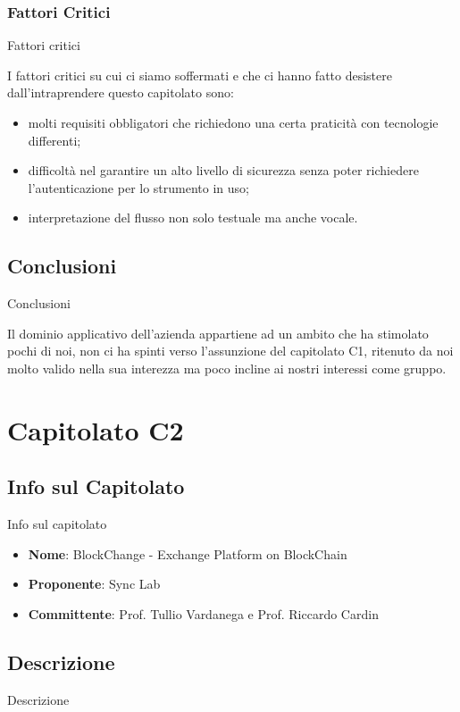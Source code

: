 \documentclass[11pt]{article}
\begin{document}
    \subsubsection{Fattori Critici} Fattori critici
    
    I fattori critici su cui ci siamo soffermati e che ci hanno fatto desistere dall'intraprendere questo capitolato sono:
    \begin{itemize}
            \item molti requisiti obbligatori che richiedono una certa praticità con tecnologie differenti;
            \item difficoltà nel garantire un alto livello di sicurezza senza poter richiedere l’autenticazione per lo strumento in uso;
            \item interpretazione del flusso non solo testuale ma anche vocale.
        \end{itemize}
    \subsection{Conclusioni} Conclusioni
    
    Il dominio applicativo dell'azienda appartiene ad un ambito che ha stimolato pochi di noi, non ci ha spinti verso l'assunzione del capitolato C1, ritenuto da noi molto valido nella sua interezza ma poco incline ai nostri interessi come gruppo.
    
    \newpage

\section{Capitolato C2}
    \subsection{Info sul Capitolato} Info sul capitolato
    \begin{itemize}
        \item \textbf{Nome}: BlockChange - Exchange Platform on BlockChain
        \item \textbf{Proponente}: Sync Lab
        \item \textbf{Committente}: Prof. Tullio Vardanega e Prof. Riccardo Cardin
    \end{itemize}
    \subsection{Descrizione} Descrizione
    
\end{document}
